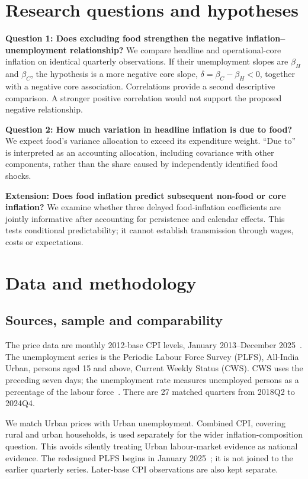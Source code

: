 \documentclass[10pt,a4paper]{article}
\begin{document}
\section{Research questions and hypotheses}

\textbf{Question 1: Does excluding food strengthen the negative inflation--unemployment relationship?} We compare headline and operational-core inflation on identical quarterly observations. If their unemployment slopes are $\beta_H$ and $\beta_C$, the hypothesis is a more negative core slope, $\delta=\beta_C-\beta_H<0$, together with a negative core association. Correlations provide a second descriptive comparison. A stronger positive correlation would not support the proposed negative relationship.

\textbf{Question 2: How much variation in headline inflation is due to food?} We expect food's variance allocation to exceed its expenditure weight. ``Due to'' is interpreted as an accounting allocation, including covariance with other components, rather than the share caused by independently identified food shocks.

\textbf{Extension: Does food inflation predict subsequent non-food or core inflation?} We examine whether three delayed food-inflation coefficients are jointly informative after accounting for persistence and calendar effects. This tests conditional predictability; it cannot establish transmission through wages, costs or expectations.

\clearpage
\section{Data and methodology}
\subsection{Sources, sample and comparability}

The price data are monthly 2012-base CPI levels, January 2013--December 2025~\cite{cpiapi}. The unemployment series is the Periodic Labour Force Survey (PLFS), All-India Urban, persons aged 15 and above, Current Weekly Status (CWS). CWS uses the preceding seven days; the unemployment rate measures unemployed persons as a percentage of the labour force~\cite{plfs2024}. There are 27 matched quarters from 2018Q2 to 2024Q4.

We match Urban prices with Urban unemployment. Combined CPI, covering rural and urban households, is used separately for the wider inflation-composition question. This avoids silently treating Urban labour-market evidence as national evidence. The redesigned PLFS begins in January 2025~\cite{plfschange}; it is not joined to the earlier quarterly series. Later-base CPI observations are also kept separate.
\end{document}
